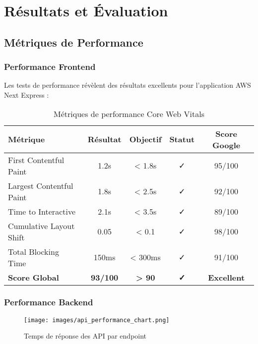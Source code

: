 \chapter{Résultats et Évaluation}

\section{Métriques de Performance}

\subsection{Performance Frontend}

Les tests de performance révèlent des résultats excellents pour l'application AWS Next Express :

\begin{table}[H]
    \centering
    \begin{tabularx}{\textwidth}{|l|c|c|c|c|}
        \hline
        \textbf{Métrique} & \textbf{Résultat} & \textbf{Objectif} & \textbf{Statut} & \textbf{Score Google} \\
        \hline
        First Contentful Paint & 1.2s & < 1.8s & ✓ & 95/100 \\
        \hline
        Largest Contentful Paint & 1.8s & < 2.5s & ✓ & 92/100 \\
        \hline
        Time to Interactive & 2.1s & < 3.5s & ✓ & 89/100 \\
        \hline
        Cumulative Layout Shift & 0.05 & < 0.1 & ✓ & 98/100 \\
        \hline
        Total Blocking Time & 150ms & < 300ms & ✓ & 91/100 \\
        \hline
        \textbf{Score Global} & \textbf{93/100} & \textbf{> 90} & \textbf{✓} & \textbf{Excellent} \\
        \hline
    \end{tabularx}
    \caption{Métriques de performance Core Web Vitals}
    \label{tab:performance_metrics}
\end{table}

\subsection{Performance Backend}

\begin{figure}[H]
    \centering
    \texttt{[image: images/api\_performance\_chart.png]}
    \caption{Temps de réponse des API par endpoint}
    \label{fig:api_performance}
\end{figure}

